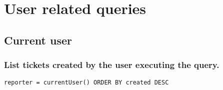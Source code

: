 \newpage
\section{User related queries}

\subsection{Current user}

\subsubsection*{List tickets created by the user executing the query.}

\begin{lstlisting}[]
    reporter = currentUser() ORDER BY created DESC
\end{lstlisting}